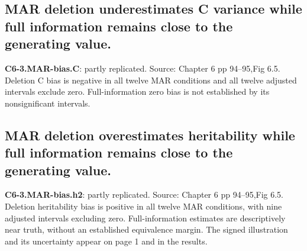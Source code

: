 \documentclass[11pt]{article}
\begin{document}
\subsection{MAR deletion underestimates C variance while full information remains close to the generating value.}
\textbf{C6-3.MAR-bias.C}: partly replicated. Source: Chapter 6 pp 94--95,Fig 6.5. Deletion C bias is negative in all twelve MAR conditions and all twelve adjusted intervals exclude zero. Full-information zero bias is not established by its nonsignificant intervals.
\subsection{MAR deletion overestimates heritability while full information remains close to the generating value.}
\textbf{C6-3.MAR-bias.h2}: partly replicated. Source: Chapter 6 pp 94--95,Fig 6.5. Deletion heritability bias is positive in all twelve MAR conditions, with nine adjusted intervals excluding zero. Full-information estimates are descriptively near truth, without an established equivalence margin. The signed illustration and its uncertainty appear on page 1 and in the results.
\end{document}

